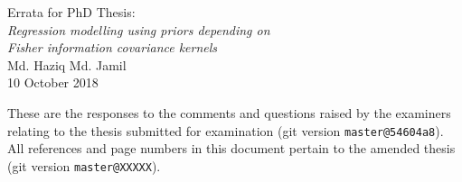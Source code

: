 \documentclass[11pt,showframe,twoside,openright]{report}
\begin{document}
\begin{center}
  {\Large Errata for PhD Thesis:} \\[0.5em]
  \textit{\large Regression modelling using priors depending on} \\[-0.2em]
  \textit{\large Fisher information covariance kernels} \\[0.5em]
  {\large Md. Haziq Md. Jamil} \\
  {\large 10 October 2018}
\end{center}

\vspace{2em}

These are the responses to the comments and questions raised by the examiners relating to the thesis submitted for examination (git version \verb|master@54604a8|).
All references and page numbers in this document pertain to the amended thesis (git version \verb|master@XXXXX|).
\end{document}

